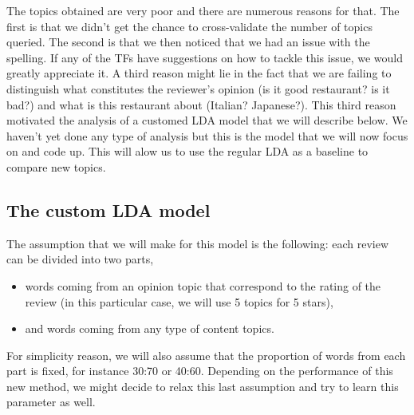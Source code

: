 \documentclass[paper=a4, fontsize=11pt]{scrartcl} %
\numberwithin{equation}{section}
\numberwithin{figure}{section}
\numberwithin{table}{section}
\begin{document}
The topics obtained are very poor and there are numerous reasons for that. The first is that we didn't get the chance to cross-validate the number of topics queried. The second is that we then noticed that we had an issue with the spelling. If any of the TFs have suggestions on how to tackle this issue, we would greatly appreciate it. A third reason might lie in the fact that we are failing to distinguish what constitutes the reviewer's opinion (is it good restaurant? is it bad?) and what is this restaurant about (Italian? Japanese?). This third reason motivated the analysis of a customed LDA model that we will describe below. We haven't yet done any type of analysis but this is the model that we will now focus on and code up. This will alow us to use the regular LDA as a baseline to compare new topics.\\

\subsection{The custom LDA model}

The assumption that we will make for this model is the following: each review can be divided into two parts,
\begin{itemize}
\item words coming from an opinion topic that correspond to the rating of the review (in this particular case, we will use 5 topics for 5 stars),
\item and words coming from any type of content topics.
\end{itemize}
For simplicity reason, we will also assume that the proportion of words from each part is fixed, for instance 30:70 or 40:60. Depending on the performance of this new method, we might decide to relax this last assumption and try to learn this parameter as well.\\
\end{document}
